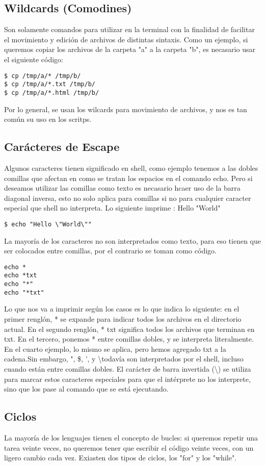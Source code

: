 \documentclass{article}
\begin{document}
\begin{itemize}
\subsection*{Wildcards (Comodines)}
Son solamente comandos para utilizar en la terminal con la finalidad de facilitar el movimiento y edición de archivos de distintas sintaxis. Como un ejemplo, si queremos copiar los archivos de la carpeta "a" a la carpeta "b", es necasario usar el siguiente código:
\begin{verbatim}
$ cp /tmp/a/* /tmp/b/
$ cp /tmp/a/*.txt /tmp/b/
$ cp /tmp/a/*.html /tmp/b/
\end{verbatim}
Por lo general, se usan los wilcards para movimiento de archivos, y nos es tan común su uso en los scritps.

\subsection*{Carácteres de Escape}
Algunos caracteres tienen significado en shell, como ejemplo tenemos a las dobles comillas que afectan en como se tratan los espacios en el comando echo. Pero si deseamos utilizar las comillas como texto es necasario hcaer uso de la barra diagonal inversa, esto no solo aplica para comillas si no para cualquier caracter especial que shell no interpreta. Lo siguiente imprime : Hello "World"
\begin{verbatim}
$ echo "Hello \"World\""
\end{verbatim}
La mayoría de los caracteres no son interpretados como texto, para eso tienen que ser colocados entre comillas, por el contrario se toman como código.
\begin{verbatim}
echo *
echo *txt
echo "*"
echo "*txt"
\end{verbatim}
Lo que nos va a imprimir según los casos es lo que indica lo siguiente: en el primer renglón, * se expande para indicar todos los archivos en el directorio actual. En el segundo renglón, * txt significa todos los archivos que terminan en txt. En el tercero, ponemos * entre comillas dobles, y se interpreta literalmente. En el cuarto ejemplo, lo mismo se aplica, pero hemos agregado txt a la cadena.Sin embargo, ", \$, ', y \textbackslash  todavía son interpretados por el shell, incluso cuando están entre comillas dobles. El carácter de barra invertida (\textbackslash) se utiliza para marcar estos caracteres especiales para que el intérprete no los interprete, sino que los pase al comando que se está ejecutando.

\subsection*{Ciclos}
La mayoría de los lenguajes tienen el concepto de bucles: si queremos repetir una tarea veinte veces, no queremos tener que escribir el código veinte veces, con un ligero cambio cada vez. Exiasten dos tipos de ciclos, los "for" y los "while".


\end{itemize}
\end{document}
